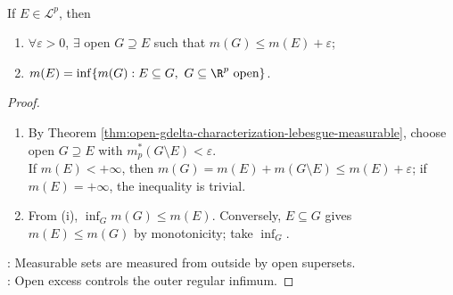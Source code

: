 \begin{corollary} \label{cor:open-outer-regularity-lebesgue-measure} \\
If $E\in\mathcal{L}^p$, then
\begin{enumerate}[label=(\roman*)]
\setlength{\itemsep}{0pt}
\item $\forall\varepsilon>0$, $\exists$ open $G\supseteq E$ such that $m(G)\leq m(E)+\varepsilon$;
\item $m(E)=\inf\{m(G):E\subseteq G,\ G\subseteq\R^p\text{ open}\}$.
\end{enumerate}
\begin{proof}
\begin{enumerate}[label=(\roman*)]
\setlength{\itemsep}{0pt}
\item By Theorem \ref{thm:open-gdelta-characterization-lebesgue-measurable}, choose open $G\supseteq E$ with $m_p^\ast(G\setminus E)<\varepsilon$.\\
If $m(E)<+\infty$, then $m(G)=m(E)+m(G\setminus E)\leq m(E)+\varepsilon$; if $m(E)=+\infty$, the inequality is trivial.
\item From (i), $\inf_Gm(G)\leq m(E)$. Conversely, $E\subseteq G$ gives $m(E)\leq m(G)$ by monotonicity; take $\inf_G$.
\end{enumerate}
: Measurable sets are measured from outside by open supersets.\\
: Open excess controls the outer regular infimum.
\end{proof}
\end{corollary}

